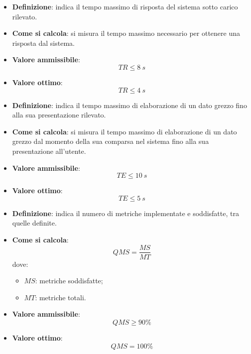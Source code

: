 \hypertarget{23M}{}
\begin{itemize}
	\item \textbf{Definizione}: indica il tempo massimo di risposta del sistema sotto carico rilevato.
	\item \textbf{Come si calcola}: si misura il tempo massimo necessario per ottenere una risposta dal sistema.
	\item \textbf{Valore ammissibile}: \begin{equation*}TR \leq 8\ s\end{equation*}
	\item \textbf{Valore ottimo}: \begin{equation*}TR \leq 4\ s\end{equation*}
\end{itemize}

\hypertarget{24M}{}
\begin{itemize}
	\item \textbf{Definizione}: indica il tempo massimo di elaborazione di un dato grezzo fino alla sua presentazione rilevato.
	\item \textbf{Come si calcola}: si misura il tempo massimo di elaborazione di un dato grezzo dal momento della sua comparsa nel sistema fino alla sua presentazione all'utente.
	\item \textbf{Valore ammissibile}: \begin{equation*}TE \leq 10\ s\end{equation*}
	\item \textbf{Valore ottimo}: \begin{equation*}TE \leq 5\ s\end{equation*}
\end{itemize}

\hypertarget{25M}{}
\begin{itemize}
	\item \textbf{Definizione}: indica il numero di metriche implementate e soddisfatte, tra quelle definite.
	\item \textbf{Come si calcola}: \begin{equation*}QMS = \frac{MS}{MT}\end{equation*} dove:
		\begin{itemize}
			\item $MS$: metriche soddisfatte;
			\item $MT$: metriche totali.
		\end{itemize}
	\item \textbf{Valore ammissibile}: \begin{equation*}QMS \geq 90\%\end{equation*}
	\item \textbf{Valore ottimo}: \begin{equation*}QMS = 100\%\end{equation*}
\end{itemize}

